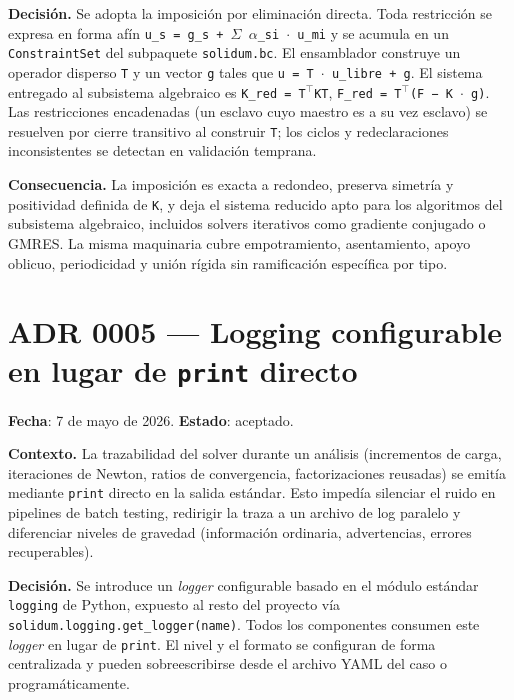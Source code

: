 \documentclass[11pt,oneside]{report}
\begin{document}
\textbf{Decisión.} Se adopta la imposición por eliminación directa. Toda restricción se expresa en forma afín \texttt{u\_\allowbreak{}s = g\_\allowbreak{}s + \ensuremath{\Sigma} \ensuremath{\alpha}\_\allowbreak{}si \ensuremath{\cdot} u\_\allowbreak{}mi} y se acumula en un \texttt{ConstraintSet} del subpaquete \texttt{solidum.bc}. El ensamblador construye un operador disperso \texttt{T} y un vector \texttt{g} tales que \texttt{u = T \ensuremath{\cdot} u\_\allowbreak{}libre + g}. El sistema entregado al subsistema algebraico es \texttt{K\_red = T\ensuremath{^{\top}}KT}, \texttt{F\_\allowbreak{}red = T\ensuremath{^{\top}}(F − K \ensuremath{\cdot} g)}. Las restricciones encadenadas (un esclavo cuyo maestro es a su vez esclavo) se resuelven por cierre transitivo al construir \texttt{T}; los ciclos y redeclaraciones inconsistentes se detectan en validación temprana.

\textbf{Consecuencia.} La imposición es exacta a redondeo, preserva simetría y positividad definida de \texttt{K}, y deja el sistema reducido apto para los algoritmos del subsistema algebraico, incluidos solvers iterativos como gradiente conjugado o GMRES. La misma maquinaria cubre empotramiento, asentamiento, apoyo oblicuo, periodicidad y unión rígida sin ramificación específica por tipo.

\section{ADR 0005 --- Logging configurable en lugar de \texttt{print}
\label{adr:0005} directo}

\textbf{Fecha}: 7 de mayo de 2026. \textbf{Estado}: aceptado.

\textbf{Contexto.} La trazabilidad del solver durante un análisis (incrementos de carga, iteraciones de Newton, ratios de convergencia, factorizaciones reusadas) se emitía mediante \texttt{print} directo en la salida estándar. Esto impedía silenciar el ruido en pipelines de batch testing, redirigir la traza a un archivo de log paralelo y diferenciar niveles de gravedad (información ordinaria, advertencias, errores recuperables).

\textbf{Decisión.} Se introduce un \textit{logger} configurable basado en el módulo estándar \texttt{logging} de Python, expuesto al resto del proyecto vía \texttt{solidum.\allowbreak{}logging.\allowbreak{}get\_\allowbreak{}logger(name)}. Todos los componentes consumen este \textit{logger} en lugar de \texttt{print}. El nivel y el formato se configuran de forma centralizada y pueden sobreescribirse desde el archivo YAML del caso o programáticamente.
\end{document}
